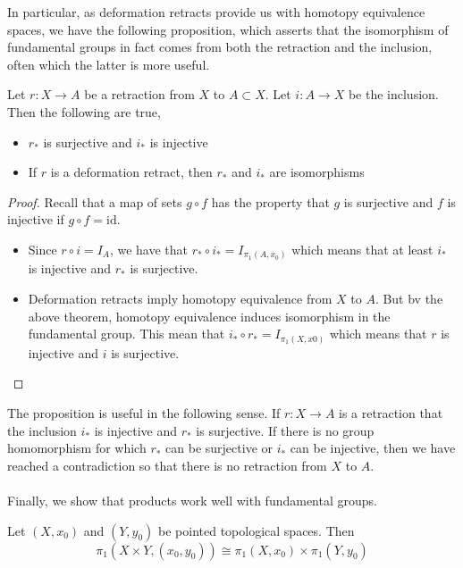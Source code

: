 \documentclass[a4paper]{article}
\begin{document}
In particular, as deformation retracts provide us with homotopy equivalence spaces, we have the following proposition, which asserts that the isomorphism of fundamental groups in fact comes from both the retraction and the inclusion, often which the latter is more useful. 

\begin{prp}{}{} Let $r:X\to A$ be a retraction from $X$ to $A\subset X$. Let $i:A\to X$ be the inclusion. Then the following are true, 
\begin{itemize}
\item $r_\ast$ is surjective and $i_\ast$ is injective
\item If $r$ is a deformation retract, then $r_\ast$ and $i_\ast$ are isomorphisms
\end{itemize} \tcbline
\begin{proof}
Recall that a map of sets $g\circ f$ has the property that $g$ is surjective and $f$ is injective if $g\circ f=\text{id}$. 
\begin{itemize}
\item Since $r\circ i=I_A$, we have that $r_\ast\circ i_\ast=I_{\pi_1(A,x_0)}$ which means that at least $i_\ast$ is injective and $r_\ast$ is surjective. 
\item Deformation retracts imply homotopy equivalence from $X$ to $A$. But bv the above theorem, homotopy equivalence induces isomorphism in the fundamental group. This mean that $i_\ast\circ r_\ast=I_{\pi_1(X,x0)}$ which means that $r$ is injective and $i$ is surjective. 
\end{itemize}
\end{proof}
\end{prp}

The proposition is useful in the following sense. If $r:X\to A$ is a retraction that the inclusion $i_\ast$ is injective and $r_\ast$ is surjective. If there is no group homomorphism for which $r_\ast$ can be surjective or $i_\ast$ can be injective, then we have reached a contradiction so that there is no retraction from $X$ to $A$. \\~\\

Finally, we show that products work well with fundamental groups. 

\begin{prp}{}{} Let $(X,x_0)$ and $(Y,y_0)$ be pointed topological spaces. Then $$\pi_1(X\times Y,(x_0,y_0))\cong\pi_1(X,x_0)\times\pi_1(Y,y_0)$$
\end{prp}
\end{document}
